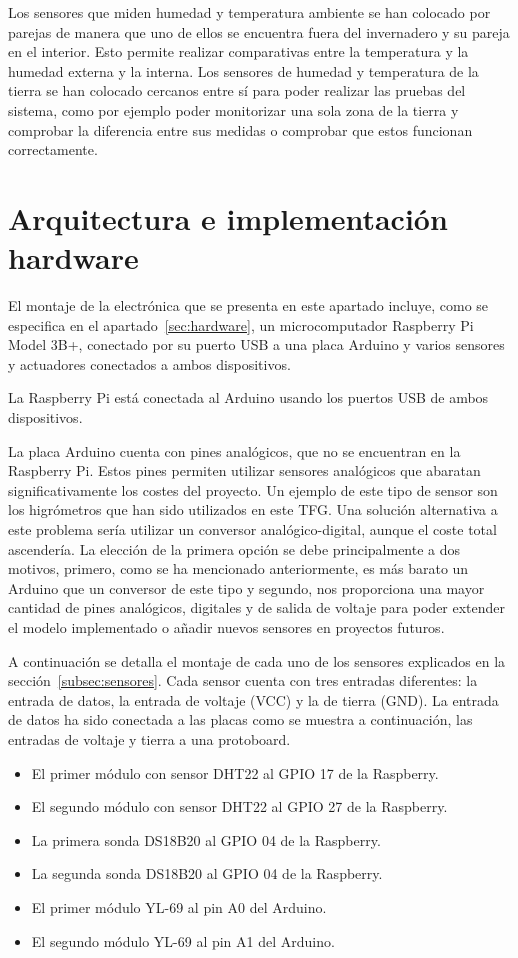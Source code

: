 \documentclass[a4paper, 12pt, oneside]{book}
\begin{document}
Los sensores que miden humedad y temperatura ambiente se han colocado por parejas de manera que uno de ellos se encuentra fuera del invernadero y su pareja en el interior. Esto permite realizar comparativas entre la temperatura y la humedad externa y la interna. Los sensores de humedad y temperatura de la tierra se han colocado cercanos entre sí para poder realizar las pruebas del sistema, como por ejemplo poder monitorizar una sola zona de la tierra y comprobar la diferencia entre sus medidas o comprobar que estos funcionan correctamente.    

\section{Arquitectura e implementación hardware}
\label{sec:Arquitectura e implementación hardware}
El montaje de la electrónica que se presenta en este apartado incluye, como se especifica en el apartado~\ref{sec:hardware}, un microcomputador Raspberry Pi Model 3B+, conectado por su puerto USB a una placa Arduino y varios sensores y actuadores conectados a ambos dispositivos.

La Raspberry Pi está conectada al Arduino usando los puertos USB de ambos dispositivos.

La placa Arduino cuenta con pines analógicos, que no se encuentran en la Raspberry Pi. Estos pines permiten utilizar sensores analógicos que abaratan significativamente los costes del proyecto. Un ejemplo de este tipo de sensor son los higrómetros que han sido utilizados en este TFG. Una solución alternativa a este problema sería utilizar un conversor analógico-digital, aunque el coste total ascendería. La elección de la primera opción se debe principalmente a dos motivos, primero, como se ha mencionado anteriormente, es más barato un Arduino que un conversor de este tipo y segundo, nos proporciona una mayor cantidad de pines analógicos, digitales y de salida de voltaje para poder extender el modelo implementado o añadir nuevos sensores en proyectos futuros.

A continuación se detalla el montaje de cada uno de los sensores explicados en la sección~\ref{subsec:sensores}. Cada sensor cuenta con tres entradas diferentes: la entrada de datos, la entrada de voltaje (VCC) y la de tierra (GND). La entrada de datos ha sido conectada a las placas como se muestra a continuación, las entradas de voltaje y tierra a una protoboard. 

\begin{itemize}
	\item El primer módulo con sensor DHT22 al GPIO 17 de la Raspberry.
	\item El segundo módulo con sensor DHT22 al GPIO 27 de la Raspberry.
		\item La primera sonda DS18B20 al GPIO 04 de la Raspberry.
	\item La segunda sonda DS18B20 al GPIO 04 de la Raspberry.
	\item El primer módulo YL-69 al pin A0 del Arduino.
	\item El segundo módulo YL-69 al pin A1 del Arduino.
\end{itemize}
\end{document}
